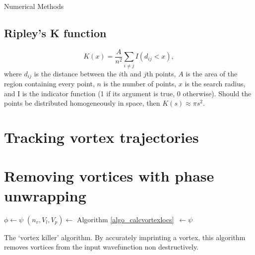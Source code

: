 \begin{chapter}{\label{cha:numerics}Numerical Methods}
	\subsection{\label{section:ripleysk} Ripley's K function }
		\begin{equation}\label{eq:ripleysk}
		K(x) = \frac{A}{n^2}\sum\limits_{i \ne j} I\left (d_{ij}<x\right ),
		\end{equation}
		where $d_{ij}$ is the distance between the $i$th and $j$th points, $A$ is the area of the region containing every point, $n$ is the number of points, $x$ is the search radius, and I is the indicator function (1 if its argument is true, 0 otherwise). Should the points be distributed homogeneously in space, then $K(s)\approx\pi s^2$.
\section{\label{section:vortextracking} Tracking vortex trajectories}
\section{\label{section:vortexremoval} Removing vortices with phase unwrapping}
	\begin{algorithm}[H]
	\BlankLine
	$\phi \leftarrow \psi$\;
	$(n_v,V_l,V_p)\leftarrow$ Algorithm \ref{algo_calcvortexlocs}~$\leftarrow\psi$\;


	\caption{The `vortex killer' algorithm. By accurately imprinting a vortex, this algorithm removes vortices from the input wavefunction non destructively.}\label{algo_vortexkiller}
	\end{algorithm}

\end{chapter}
